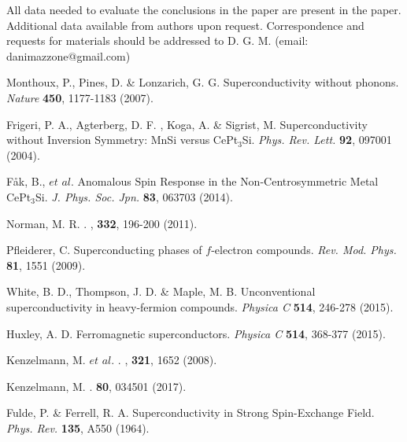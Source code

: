 \documentclass[article,twocolumn,showpacs,preprintnumbers,amsmath,amssymb, superscriptaddress]{revtex4-1}
\begin{document}
All data needed to evaluate the conclusions in the paper are present in the paper. Additional data available from authors upon request. Correspondence and requests for materials should be addressed to D. G. M. (email: danimazzone@gmail.com)
\def\bibsection{\section*{\refname}}
\begin{thebibliography}{20}

Monthoux, P., Pines, D. \& Lonzarich, G. G.
\newblock Superconductivity without phonons.
\newblock \textit{Nature} \textbf{450}, 1177-1183 (2007).

Frigeri, P. A., Agterberg, D. F. , Koga, A. \& Sigrist, M.
\newblock Superconductivity without Inversion Symmetry: MnSi versus CePt$_3$Si.
\newblock \textit{Phys. Rev. Lett.} \textbf{92}, 097001 (2004).

F\r{a}k, B., $et$ $al.$
\newblock Anomalous Spin Response in the Non-Centrosymmetric Metal CePt$_3$Si.
\newblock \textit{J. Phys. Soc. Jpn.} \textbf{83}, 063703 (2014).

Norman, M. R.
.
, \textbf{332}, 196-200 (2011).

Pfleiderer, C.
\newblock  Superconducting phases of $f$-electron compounds.
\newblock \textit{Rev. Mod. Phys.} \textbf{81}, 1551 (2009).

White, B. D., Thompson, J. D. \& Maple, M. B.
\newblock  Unconventional superconductivity in heavy-fermion compounds.
\newblock \textit{Physica C} \textbf{514}, 246-278 (2015).

Huxley, A. D.
 \newblock Ferromagnetic superconductors. \newblock
 \textit{Physica C} \textbf{514}, 368-377 (2015).
 
Kenzelmann, M. $et$ $al.$
.
, \textbf{321}, 1652 (2008).

Kenzelmann, M.
.
 \textbf{80}, 034501 (2017).

Fulde, P. \& Ferrell, R. A.
\newblock Superconductivity in Strong Spin-Exchange Field.
\newblock \textit{Phys. Rev.} \textbf{135}, A550 (1964).
 

\end{thebibliography}
\end{document}
